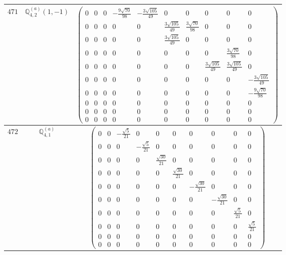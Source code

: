 \documentclass[fleqn,8pt,landscape]{jsarticle}
\begin{document}
\begin{center}
\begin{longtable}{ccc}
$ 471 $ & $ \mathbb{Q}_{4,2}^{(a)}(1,-1) $ & $ \begin{pmatrix} 0 & 0 & 0 & - \frac{9 \sqrt{70}}{98} & - \frac{3 \sqrt{105}}{49} & 0 & 0 & 0 & 0 & 0 \\ 0 & 0 & 0 & 0 & 0 & \frac{3 \sqrt{105}}{49} & \frac{3 \sqrt{70}}{98} & 0 & 0 & 0 \\ 0 & 0 & 0 & 0 & 0 & \frac{3 \sqrt{105}}{49} & 0 & 0 & 0 & 0 \\ 0 & 0 & 0 & 0 & 0 & 0 & 0 & 0 & \frac{3 \sqrt{70}}{98} & 0 \\ 0 & 0 & 0 & 0 & 0 & 0 & 0 & \frac{3 \sqrt{105}}{49} & \frac{3 \sqrt{105}}{49} & 0 \\ 0 & 0 & 0 & 0 & 0 & 0 & 0 & 0 & 0 & - \frac{3 \sqrt{105}}{49} \\ 0 & 0 & 0 & 0 & 0 & 0 & 0 & 0 & 0 & - \frac{9 \sqrt{70}}{98} \\ 0 & 0 & 0 & 0 & 0 & 0 & 0 & 0 & 0 & 0 \\ 0 & 0 & 0 & 0 & 0 & 0 & 0 & 0 & 0 & 0 \\ 0 & 0 & 0 & 0 & 0 & 0 & 0 & 0 & 0 & 0 \end{pmatrix} $ \\ \hline
$ 472 $ & $ \mathbb{Q}_{4,1}^{(a)} $ & $ \begin{pmatrix} 0 & 0 & - \frac{\sqrt{5}}{21} & 0 & 0 & 0 & 0 & 0 & 0 & 0 \\ 0 & 0 & 0 & - \frac{\sqrt{5}}{21} & 0 & 0 & 0 & 0 & 0 & 0 \\ 0 & 0 & 0 & 0 & \frac{\sqrt{30}}{21} & 0 & 0 & 0 & 0 & 0 \\ 0 & 0 & 0 & 0 & 0 & \frac{\sqrt{30}}{21} & 0 & 0 & 0 & 0 \\ 0 & 0 & 0 & 0 & 0 & 0 & - \frac{\sqrt{30}}{21} & 0 & 0 & 0 \\ 0 & 0 & 0 & 0 & 0 & 0 & 0 & - \frac{\sqrt{30}}{21} & 0 & 0 \\ 0 & 0 & 0 & 0 & 0 & 0 & 0 & 0 & \frac{\sqrt{5}}{21} & 0 \\ 0 & 0 & 0 & 0 & 0 & 0 & 0 & 0 & 0 & \frac{\sqrt{5}}{21} \\ 0 & 0 & 0 & 0 & 0 & 0 & 0 & 0 & 0 & 0 \\ 0 & 0 & 0 & 0 & 0 & 0 & 0 & 0 & 0 & 0 \end{pmatrix} $ \\ \hline

\end{longtable}
\end{center}
\end{document}
